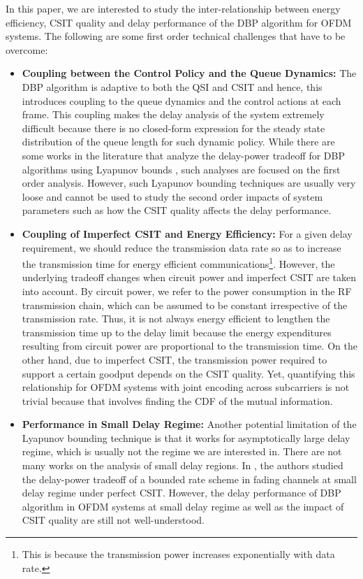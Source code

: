 \documentclass[11pt,journal, onecolumn]{./IEEEtran}
\newcommand{\red}{\color{black}}
\begin{document}
In this paper, we are interested to study the inter-relationship between energy efficiency, CSIT quality and delay performance of the DBP algorithm for OFDM systems. The following are some first order technical challenges that have to be overcome:
\begin{itemize}

\item \textbf{Coupling between the Control Policy and the Queue Dynamics:} The DBP algorithm is adaptive to both the QSI and CSIT and hence, this introduces coupling to the queue dynamics and the control actions at each frame. This coupling makes the delay analysis of the system extremely difficult because there is no closed-form expression for the steady state distribution of the queue length for such dynamic policy. While there are some works in the literature that analyze the delay-power tradeoff for DBP algorithms using Lyapunov bounds \cite{neely_energy_2006}, such analyses are focused on the first order analysis. However, such Lyapunov bounding techniques are usually very loose and cannot be used to study {\red the second order impacts of system parameters} such as how the CSIT quality affects the delay performance.


\item \textbf{Coupling of Imperfect CSIT and Energy Efficiency:} For a given delay requirement, we should reduce the transmission data rate so as to increase the transmission time \cite{qiao_miser:_2003, zafer_minimum_2009} for energy efficient communications\footnote{This is because the transmission power increases exponentially with data rate.}. However, {\red the underlying tradeoff changes} when circuit power and imperfect CSIT are taken into account. By circuit power, we refer to the power consumption in the RF transmission chain, which can be assumed to be constant irrespective of the transmission rate. Thus, it is not always energy efficient to lengthen the transmission time up to the delay limit because the energy expenditures resulting from circuit power are proportional to the transmission time. On the other hand, due to imperfect CSIT, the transmission power required to support a certain goodput depends on the CSIT quality. Yet, quantifying this relationship for OFDM systems with joint encoding across subcarriers is not trivial because that involves finding the CDF of the mutual information.

\item \textbf{Performance in Small Delay Regime:} Another potential limitation of the Lyapunov bounding technique is that it works for asymptotically large delay regime, which is usually not the regime we are interested in. There are not many works on the analysis of small delay regions. In \cite{berry_optimal_2006}, the authors studied the delay-power tradeoff of a bounded rate scheme in fading channels at small delay regime under perfect CSIT. However, the delay performance of DBP algorithm in OFDM systems at small delay regime as well as the impact of CSIT quality are still not well-understood.
\end{itemize}
\end{document}
